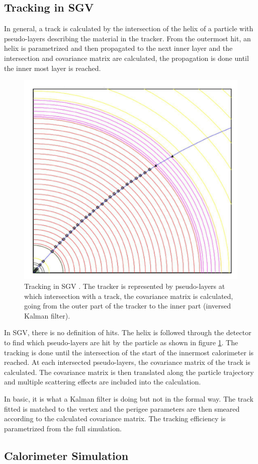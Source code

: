 \subsection{Tracking in SGV}

In general, a track is calculated by the intersection of the helix of a particle with pseudo-layers describing the material in the tracker. From the outermost hit, an helix is parametrized and then propagated to the next inner layer and the intersection and covariance matrix are calculated, the propagation is done until the inner most layer is reached.

\begin{figure}[htbp!]
  \centering
  \includegraphics[width=0.3\linewidth]{../Thesis_Plots/SGV/Plots/Tracking_SGV.png}
  \caption{Tracking in SGV \cite{Berggren2012}. The tracker is represented by pseudo-layers at which intersection with a track, the covariance matrix is calculated, going from the outer part of the tracker to the inner part (inversed Kalman filter).}
  \label{fig:tracking_sgv}
\end{figure}

In SGV, there is no definition of hits. The helix is followed through the detector to find which pseudo-layers are hit by the particle as shown in figure \ref{fig:tracking_sgv}. The tracking is done until the intersection of the start of the innermost calorimeter is reached. At each intersected pseudo-layers, the covariance matrix of the track is calculated. The covariance matrix is then translated along the particle trajectory and multiple scattering effects are included into the calculation.

In basic, it is what a Kalman filter \cite{Li2013} is doing but not in the formal way. The track fitted is matched to the vertex and the perigee parameters are then smeared according to the calculated covariance matrix. The tracking efficiency is parametrized from the full simulation.

\subsection{Calorimeter Simulation}

